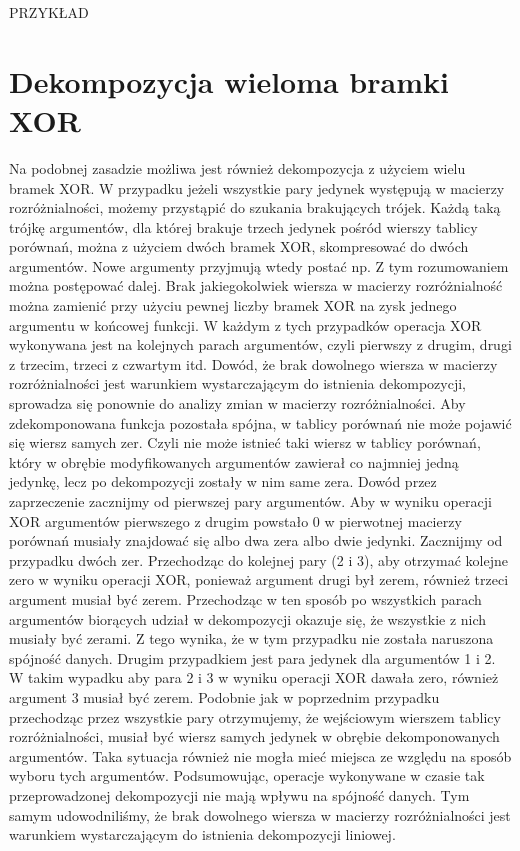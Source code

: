 PRZYKŁAD


\section{Dekompozycja wieloma bramki XOR}

Na podobnej zasadzie możliwa jest również dekompozycja z użyciem wielu bramek XOR.
W przypadku jeżeli wszystkie pary jedynek występują w macierzy rozróżnialności, możemy przystąpić do szukania brakujących trójek.
Każdą taką trójkę argumentów, dla której brakuje trzech jedynek pośród wierszy tablicy porównań, można z użyciem dwóch bramek XOR, skompresować do dwóch argumentów.
Nowe argumenty przyjmują wtedy postać np.
 Z tym rozumowaniem można postępować dalej.
Brak jakiegokolwiek wiersza w macierzy rozróżnialność można zamienić przy użyciu pewnej liczby bramek XOR na zysk jednego argumentu w końcowej funkcji.
W każdym z tych przypadków operacja XOR wykonywana jest na kolejnych parach argumentów, czyli pierwszy z drugim, drugi z trzecim, trzeci z czwartym itd.
Dowód, że brak dowolnego wiersza w macierzy rozróżnialności jest warunkiem wystarczającym do istnienia dekompozycji, sprowadza się ponownie do analizy zmian w macierzy rozróżnialności.
Aby zdekomponowana funkcja pozostała spójna, w tablicy porównań nie może pojawić się wiersz samych zer.
Czyli nie może istnieć taki wiersz w tablicy porównań, który w obrębie modyfikowanych argumentów zawierał co najmniej jedną jedynkę, lecz po dekompozycji zostały w nim same zera.
Dowód przez zaprzeczenie zacznijmy od pierwszej pary argumentów.
Aby w wyniku operacji XOR argumentów pierwszego z drugim powstało 0 w pierwotnej macierzy porównań musiały znajdować się albo dwa zera albo dwie jedynki.
Zacznijmy od przypadku dwóch zer.
Przechodząc do kolejnej pary (2 i 3), aby otrzymać kolejne zero w wyniku operacji XOR, ponieważ argument drugi był zerem, również trzeci argument musiał być zerem.
Przechodząc w ten sposób po wszystkich parach argumentów biorących udział w dekompozycji okazuje się, że wszystkie z nich musiały być zerami.
Z tego wynika, że w tym przypadku nie została naruszona spójność danych.
Drugim przypadkiem jest para jedynek dla argumentów 1 i 2.
W takim wypadku aby para 2 i 3 w wyniku operacji XOR dawała zero, również argument 3 musiał być zerem.
Podobnie jak w poprzednim przypadku przechodząc przez wszystkie pary otrzymujemy, że wejściowym wierszem tablicy rozróżnialności, musiał być wiersz samych jedynek w obrębie dekomponowanych argumentów.
Taka sytuacja również nie mogła mieć miejsca ze względu na sposób wyboru tych argumentów.
Podsumowując, operacje wykonywane w czasie tak przeprowadzonej dekompozycji nie mają wpływu na spójność danych.
Tym samym udowodniliśmy, że brak dowolnego wiersza w macierzy rozróżnialności jest warunkiem wystarczającym do istnienia dekompozycji liniowej.

